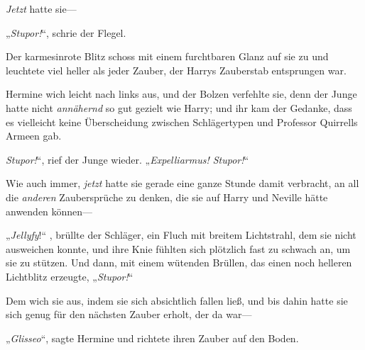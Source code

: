 \emph{Jetzt} hatte sie—

„\emph{Stupor!}“, schrie der Flegel.

Der karmesinrote Blitz schoss mit einem furchtbaren Glanz auf sie zu und leuchtete viel heller als jeder Zauber, der Harrys Zauberstab entsprungen war.

Hermine wich leicht nach links aus, und der Bolzen verfehlte sie, denn der Junge hatte nicht \emph{annähernd} so gut gezielt wie Harry; und ihr kam der Gedanke, dass es vielleicht keine Überscheidung zwischen Schlägertypen und Professor Quirrells Armeen gab.

\emph{Stupor!}“, rief der Junge wieder. „\emph{Expelliarmus! Stupor!}“

Wie auch immer, \emph{jetzt} hatte sie gerade eine ganze Stunde damit verbracht, an all die \emph{anderen} Zaubersprüche zu denken, die sie auf Harry und Neville hätte anwenden können—

„\emph{Jellyfy}!“ , brüllte der Schläger, ein Fluch mit breitem Lichtstrahl, dem sie nicht ausweichen konnte, und ihre Knie fühlten sich plötzlich fast zu schwach an, um sie zu stützen. Und dann, mit einem wütenden Brüllen, das einen noch helleren Lichtblitz erzeugte, „\emph{Stupor!}“

Dem wich sie aus, indem sie sich absichtlich fallen ließ, und bis dahin hatte sie sich genug für den nächsten Zauber erholt, der da war—

„\emph{Glisseo}“, sagte Hermine und richtete ihren Zauber auf den Boden.

